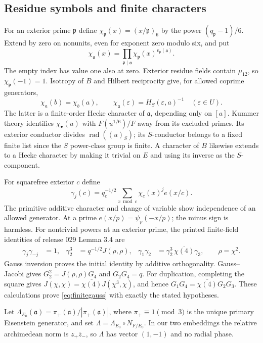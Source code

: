 \documentclass[11pt,a4paper]{article}
\numberwithin{equation}{section}
\theoremstyle{definition}
\theoremstyle{remark}
\newcommand{\rad}{\operatorname{rad}}
\begin{document}
\subsection{Residue symbols and finite characters}\label{sec:gauss}
For an exterior prime $\mathfrak p$ define $\chi_{\mathfrak p}(x)=(x/\mathfrak p)_6$ by the power $(q_{\mathfrak p}-1)/6$. Extend by zero on nonunits, even for exponent zero modulo six, and put
\[
 \chi_{\mathfrak a}(x)=\prod_{\mathfrak p\mid\mathfrak a}
                 \chi_{\mathfrak p}(x)^{v_{\mathfrak p}(\mathfrak a)}.
\]
The empty index has value one also at zero. Exterior residue fields contain $\mu_{12}$, so $\chi_{\mathfrak p}(-1)=1$. Isotropy of $B$ and Hilbert reciprocity give, for allowed coprime generators,
\[
 \chi_a(b)=\chi_b(a),\qquad
 \chi_{\mathfrak a}(\varepsilon)=H_S(\varepsilon,a)^{-1}\quad(\varepsilon\in U).
\]
The latter is a finite-order Hecke character of $\mathfrak a$, depending only on $[a]$. Kummer theory identifies $\chi_\bullet(u)$ with $F(u^{1/6})/F$ away from its excluded primes. Its exterior conductor divides $\rad((u)_S)$; its $S$-conductor belongs to a fixed finite list since the $S$ power-class group is finite. A character of $B$ likewise extends to a Hecke character by making it trivial on $E$ and using its inverse as the $S$-component.

For squarefree exterior $c$ define
\[
 \gamma_j(c)=q_c^{-1/2}\sum_{x\bmod c}\chi_c(x)^je(x/c).
\]
The primitive additive character and change of variable show independence of an allowed generator. At a prime $e(x/p)=\psi_p(-x/p)$; the minus sign is harmless. For nontrivial powers at an exterior prime, the printed finite-field identities of release 029 Lemma 3.4 are
\begin{align}\label{eq:finitegauss}
 \gamma_j\gamma_{-j}&=1,&
 \gamma_2^3&=q^{-1/2}J(\rho,\rho),&
 \gamma_1\gamma_2&=\gamma_2^3\,\overline{\chi(4)}\gamma_3,
 \qquad \rho=\chi^2.
\end{align}
Gauss inversion proves the initial identity by additive orthogonality. Gauss--Jacobi gives $G_2^2=J(\rho,\rho)G_4$ and $G_2G_4=q$. For duplication, completing the square gives
$J(\chi,\chi)=\overline{\chi(4)}J(\chi^3,\chi)$, and hence
$G_1G_4=\overline{\chi(4)}G_2G_3$. These calculations prove \eqref{eq:finitegauss} with exactly the stated hypotheses.

Let $\Lambda_{E_0}(\mathfrak a)=\pi_+(\mathfrak a)/|\pi_+(\mathfrak a)|$, where $\pi_+\equiv1\pmod3$ is the unique primary Eisenstein generator, and set $\Lambda=\Lambda_{E_0}\circ N_{F/E_0}$. In our two embeddings the relative archimedean norm is $z_+\bar z_-$, so $\Lambda$ has vector $(1,-1)$ and no radial phase.
\end{document}
